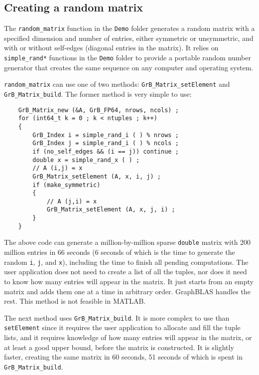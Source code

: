 \documentclass[12pt]{article}
\begin{document}
\newpage
\subsection{Creating a random matrix}
\label{random}

The \verb'random_matrix' function in the \verb'Demo' folder generates a random
matrix with a specified dimension and number of entries, either symmetric or
unsymmetric, and with or without self-edges (diagonal entries in the matrix).
It relies on \verb'simple_rand*' functions in the \verb'Demo' folder to provide
a portable random number generator that creates the same sequence on any
computer and operating system.

\verb'random_matrix' can use one of two methods: \verb'GrB_Matrix_setElement'
and \verb'GrB_Matrix_build'.  The former method is very simple to use:

    {\footnotesize
    \begin{verbatim}
    GrB_Matrix_new (&A, GrB_FP64, nrows, ncols) ;
    for (int64_t k = 0 ; k < ntuples ; k++)
    {
        GrB_Index i = simple_rand_i ( ) % nrows ;
        GrB_Index j = simple_rand_i ( ) % ncols ;
        if (no_self_edges && (i == j)) continue ;
        double x = simple_rand_x ( ) ;
        // A (i,j) = x
        GrB_Matrix_setElement (A, x, i, j) ;
        if (make_symmetric)
        {
            // A (j,i) = x
            GrB_Matrix_setElement (A, x, j, i) ;
        }
    } \end{verbatim}}

The above code can generate a million-by-million sparse \verb'double' matrix
with 200 million entries in 66 seconds (6 seconds of which is the time to
generate the random \verb'i', \verb'j', and \verb'x'), including the time
to finish all pending computations.  The user application does not need to
create a list of all the tuples, nor does it need to know how many entries will
appear in the matrix.  It just starts from an empty matrix and adds them one at
a time in arbitrary order.  GraphBLAS handles the rest.  This method is not
feasible in MATLAB.

The next method uses \verb'GrB_Matrix_build'.  It is more complex to use than
\verb'setElement' since it requires the user application to allocate and fill
the tuple lists, and it requires knowledge of how many entries will appear in
the matrix, or at least a good upper bound, before the matrix is constructed.
It is slightly faster, creating the same matrix in 60 seconds, 51 seconds
of which is spent in \verb'GrB_Matrix_build'.
\end{document}
